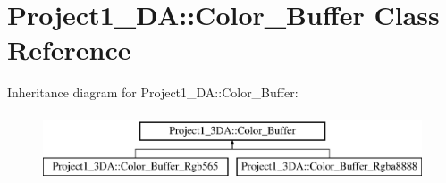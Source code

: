 \hypertarget{class_project1__3_d_a_1_1_color___buffer}{}\section{Project1\+\_\+DA\+::Color\+\_\+\+Buffer Class Reference}
\label{class_project1__3_d_a_1_1_color___buffer}
Inheritance diagram for Project1\+\_\+DA\+::Color\+\_\+\+Buffer\+:\begin{figure}[H]
\begin{center}
\leavevmode
\includegraphics[height=2.000000cm]{class_project1__3_d_a_1_1_color___buffer}
\end{center}
\end{figure}
